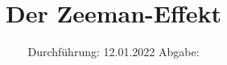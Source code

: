 

\subject{V27}
\title{Der Zeeman-Effekt}
\date{%
  Durchführung: 12.01.2022
  \hspace{3em}
  Abgabe: 
}



\maketitle
\thispagestyle{empty}
\tableofcontents
\newpage







\printbibliography{}


